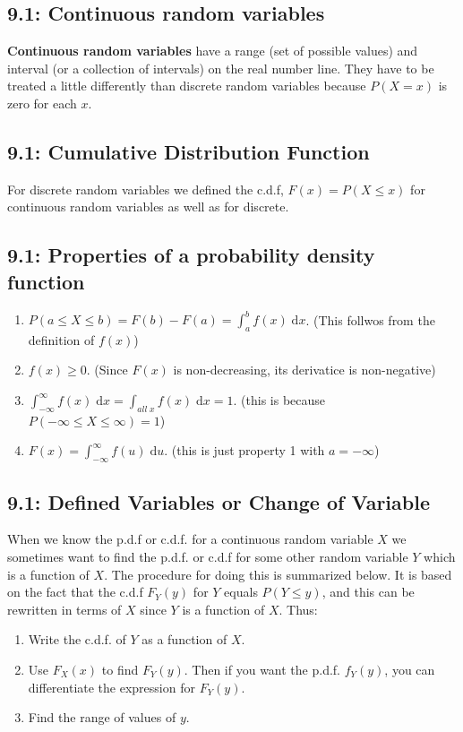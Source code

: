 \documentclass[11pt]{article}
\begin{document}
     	\subsection*{9.1: Continuous random variables}
     		{\bf Continuous random variables} have a range (set of possible values) and interval (or a collection of intervals) on the real number line. They have to be treated a little differently than discrete random variables because $P(X=x)$ is zero for each $x$. 
     	\subsection*{9.1: Cumulative Distribution Function}
     		For discrete random variables we defined the c.d.f, $F(x) = P(X \leq x)$ for continuous random variables as well as for discrete.
     		
     	\subsection*{9.1: Properties of a probability density function}
     		\begin{enumerate}
     			\item $P(a \leq X \leq b) = F(b)-F(a)= \int_a^b \! f(x)\; \mathrm{d}x$. (This follwos from the definition of $f(x)$)
     			
     			\item $f(x) \geq 0$. (Since $F(x)$ is non-decreasing, its derivatice is non-negative)
     			
     			\item $\int_{-\infty}^{\infty} \!f(x) \; \mathrm{d}x=\int_{all\;x} \! f(x) \; \mathrm{d}x = 1$. (this is because $P(-\infty \leq X\leq \infty)=1$)
     			
     			\item $F(x) = \int_{-\infty}^{\infty} \! f(u) \; \mathrm{d}u$. (this is just property 1 with $a=-\infty$)
     		\end{enumerate}
     	\subsection*{9.1: Defined Variables or Change of Variable}
     		When we know the p.d.f or c.d.f. for a continuous random variable $X$ we sometimes want to find the p.d.f. or c.d.f for some other random variable $Y$ which is a function of $X$. The procedure for doing this is summarized below. It is based on the fact that the c.d.f $F_Y(y)$ for $Y$ equals $P(Y\leq y)$, and this can be rewritten in terms of $X$ since $Y$ is a function of $X$. Thus:\\
     		\begin{enumerate}
     			\item Write the c.d.f. of $Y$ as a function of $X$.
     			\item Use $F_X(x)$ to find $F_Y(y)$. Then if you want the p.d.f. $f_Y(y)$, you can differentiate the expression for $F_Y(y)$.
     			\item Find the range of values of $y$.
     		\end{enumerate}
     	
\end{document}
